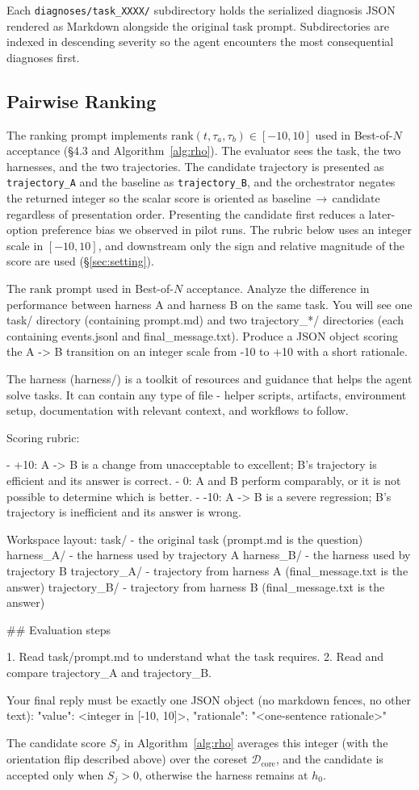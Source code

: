 \noindent Each \texttt{diagnoses/task\_XXXX/} subdirectory holds the
serialized diagnosis JSON rendered as Markdown alongside the original
task prompt. Subdirectories are indexed in descending severity so the
agent encounters the most consequential diagnoses first.

\subsection{Pairwise Ranking}

 The ranking prompt implements
$\mathrm{rank}(t, \tau_a, \tau_b) \in [-10, 10]$ used in Best-of-$N$
acceptance (\S 4.3 and Algorithm~\ref{alg:rho}). The evaluator sees the task, the
two harnesses, and the two trajectories. The candidate trajectory is
presented as \texttt{trajectory\_A} and the baseline as
\texttt{trajectory\_B}, and the orchestrator negates the returned integer
so the scalar score is oriented as baseline\,$\to$\,candidate
regardless of presentation order. Presenting the candidate first
reduces a later-option preference bias we observed in pilot runs.
The rubric below uses an integer scale in $[-10,10]$, and downstream only
the sign and relative magnitude of the score are used (\S\ref{sec:setting}).

\begin{promptbox}{The $\mathrm{rank}$ prompt used in Best-of-$N$ acceptance.}
Analyze the difference in performance between harness A and harness B on the same task. You will see one task/ directory (containing prompt.md) and two trajectory_*/ directories (each containing events.jsonl and final_message.txt). Produce a JSON object scoring the A -> B transition on an integer scale from -10 to +10 with a short rationale.

The harness (harness/) is a toolkit of resources and guidance that helps the agent solve tasks. It can contain any type of file - helper scripts, artifacts, environment setup, documentation with relevant context, and workflows to follow.

Scoring rubric:

- +10: A -> B is a change from unacceptable to excellent; B's trajectory is efficient and its answer is correct.
- 0: A and B perform comparably, or it is not possible to determine which is better.
- -10: A -> B is a severe regression; B's trajectory is inefficient and its answer is wrong.

Workspace layout:
  task/                 - the original task (prompt.md is the question)
  harness_A/            - the harness used by trajectory A
  harness_B/            - the harness used by trajectory B
  trajectory_A/         - trajectory from harness A (final_message.txt is the answer)
  trajectory_B/         - trajectory from harness B (final_message.txt is the answer)

## Evaluation steps

1. Read task/prompt.md to understand what the task requires.
2. Read and compare trajectory_A and trajectory_B.

Your final reply must be exactly one JSON object (no markdown fences, no other text):
{"value": <integer in [-10, 10]>, "rationale": "<one-sentence rationale>"}
\end{promptbox}

\noindent The candidate score $S_j$ in Algorithm~\ref{alg:rho} averages this
integer (with the orientation flip described above) over the coreset
$\mathcal{D}_{\mathrm{core}}$, and the candidate is accepted only when
$S_j > 0$, otherwise the harness remains at $h_0$.
